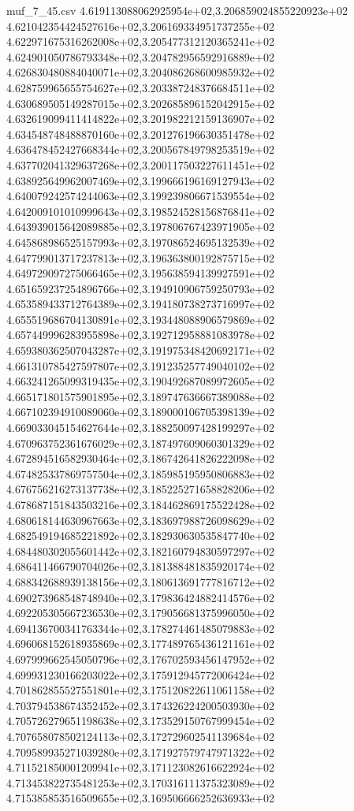 \begin{filecontents*}{muf_7_45.csv}
4.619113088062925954e+02,3.206859024855220923e+02
4.621042354424527616e+02,3.206169334951737255e+02
4.622971675316262008e+02,3.205477312120365241e+02
4.624901050786793348e+02,3.204782956592916889e+02
4.626830480884040071e+02,3.204086268600985932e+02
4.628759965655754627e+02,3.203387248376684511e+02
4.630689505149287015e+02,3.202685896152042915e+02
4.632619099411414822e+02,3.201982212159136907e+02
4.634548748488870160e+02,3.201276196630351478e+02
4.636478452427668344e+02,3.200567849798253519e+02
4.637702041329637268e+02,3.200117503227611451e+02
4.638925649962007469e+02,3.199666196169127943e+02
4.640079242574244063e+02,3.199239806671539554e+02
4.642009101010999643e+02,3.198524528156876841e+02
4.643939015642089885e+02,3.197806767423971905e+02
4.645868986525157993e+02,3.197086524695132539e+02
4.647799013717237813e+02,3.196363800192875715e+02
4.649729097275066465e+02,3.195638594139927591e+02
4.651659237254896766e+02,3.194910906759250793e+02
4.653589433712764389e+02,3.194180738273716997e+02
4.655519686704130891e+02,3.193448088906579869e+02
4.657449996283955898e+02,3.192712958881083978e+02
4.659380362507043287e+02,3.191975348420692171e+02
4.661310785427597807e+02,3.191235257749040102e+02
4.663241265099319435e+02,3.190492687089972605e+02
4.665171801575901895e+02,3.189747636667389088e+02
4.667102394910089060e+02,3.189000106705398139e+02
4.669033045154627644e+02,3.188250097428199297e+02
4.670963752361676029e+02,3.187497609060301329e+02
4.672894516582930464e+02,3.186742641826222098e+02
4.674825337869757504e+02,3.185985195950806883e+02
4.676756216273137738e+02,3.185225271658828206e+02
4.678687151843503216e+02,3.184462869175522428e+02
4.680618144630967663e+02,3.183697988726098629e+02
4.682549194685221892e+02,3.182930630535847740e+02
4.684480302055601442e+02,3.182160794830597297e+02
4.686411466790704026e+02,3.181388481835920174e+02
4.688342688939138156e+02,3.180613691777816712e+02
4.690273968548748940e+02,3.179836424882414576e+02
4.692205305667236530e+02,3.179056681375996050e+02
4.694136700341763344e+02,3.178274461485079883e+02
4.696068152618935869e+02,3.177489765436121161e+02
4.697999662545050796e+02,3.176702593456147952e+02
4.699931230166203022e+02,3.175912945772006424e+02
4.701862855527551801e+02,3.175120822611061158e+02
4.703794538674352452e+02,3.174326224200503930e+02
4.705726279651198638e+02,3.173529150767999454e+02
4.707658078502124113e+02,3.172729602541139684e+02
4.709589935271039280e+02,3.171927579747971322e+02
4.711521850001209941e+02,3.171123082616622924e+02
4.713453822735481253e+02,3.170316111375323089e+02
4.715385853516509655e+02,3.169506666252636933e+02

\end{filecontents*}
